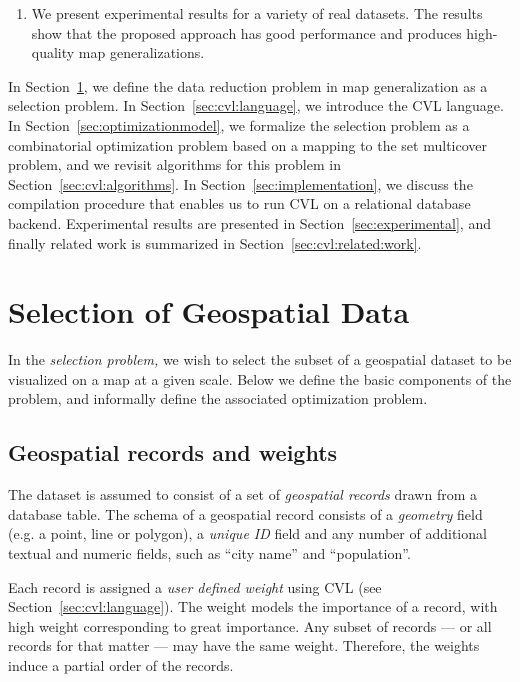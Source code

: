 \documentclass[11pt, oneside]{report}
\begin{document}
{\begin{enumerate}
\item We present experimental results for a variety of real datasets. The results show that the proposed approach has good performance and produces high-quality map generalizations.
\end{enumerate}

In Section~\ref{sec:cvl:background}, we define the data reduction problem in map generalization as a selection problem. In Section~\ref{sec:cvl:language}, we introduce the CVL language. In Section~\ref{sec:optimizationmodel}, we formalize the selection problem as a combinatorial optimization problem based on a mapping to the set multicover problem, and we revisit algorithms for this problem in Section~\ref{sec:cvl:algorithms}. In Section~\ref{sec:implementation}, we discuss the compilation procedure that enables us to run CVL on a relational database backend. Experimental results are presented in Section~\ref{sec:experimental}, and finally related work is summarized in Section~\ref{sec:cvl:related:work}.

\section{Selection of Geospatial Data}
\label{sec:cvl:background}

In the \emph{selection problem,} we wish to select the subset of a geospatial dataset to be visualized on a map at a given scale. Below we define the basic components of the problem, and informally define the associated optimization problem.

\subsection{Geospatial records and weights}
\label{sec:cvl:records}

The dataset is assumed to consist of a set of \emph{geospatial records} drawn from a database table. The schema of a geospatial record consists of a \emph{geometry} field (e.g. a point, line or polygon), a \emph{unique ID} field and any number of additional textual and numeric fields, such as ``city name'' and ``population''.

Each record is assigned a \emph{user defined weight} using CVL (see Section~\ref{sec:cvl:language}). The weight models the importance of a record, with high weight corresponding to great importance. Any subset of records --- or all records for that matter --- may have the same weight. Therefore, the weights induce a partial order of the records.

}
\end{document}
